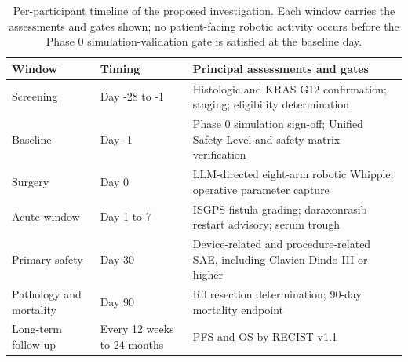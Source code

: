 \begin{table}[t]
\caption{Per-participant timeline of the proposed investigation. Each window carries
the assessments and gates shown; no patient-facing robotic activity occurs before
the Phase 0 simulation-validation gate is satisfied at the baseline day.}
\label{tab:sec02-timeline}
\centering
\begin{tabularx}{\textwidth}{L{3.0cm} L{2.4cm} Y}
\toprule
\textbf{Window} & \textbf{Timing} & \textbf{Principal assessments and gates} \\
\midrule
Screening & Day -28 to -1 & Histologic and KRAS G12 confirmation; staging; eligibility determination \\
Baseline & Day -1 & Phase 0 simulation sign-off; Unified Safety Level and safety-matrix verification \\
Surgery & Day 0 & LLM-directed eight-arm robotic Whipple; operative parameter capture \\
Acute window & Day 1 to 7 & ISGPS fistula grading; daraxonrasib restart advisory; serum trough \\
Primary safety & Day 30 & Device-related and procedure-related SAE, including Clavien-Dindo III or higher \\
Pathology and mortality & Day 90 & R0 resection determination; 90-day mortality endpoint \\
Long-term follow-up & Every 12 weeks to 24 months & PFS and OS by RECIST v1.1 \\
\bottomrule
\end{tabularx}
\end{table}


